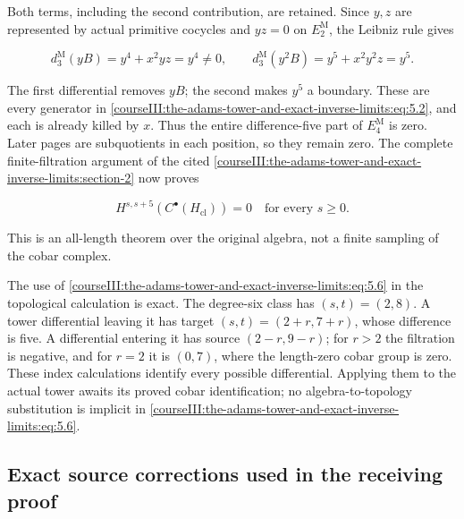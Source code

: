 Both terms, including the second contribution, are retained. Since \(y,z\) are represented by actual primitive cocycles and \(yz=0\) on \(E_2^{\mathrm M}\), the Leibniz rule gives

\begin{equation}
d_3^{\mathrm M}(yB)=y^4+x^2yz=y^4\ne0,
 \qquad d_3^{\mathrm M}(y^2B)=y^5+x^2y^2z=y^5.
 \label{courseIII:the-adams-tower-and-exact-inverse-limits:eq:5.5}
\end{equation}

The first differential removes \(yB\); the second makes \(y^5\) a boundary. These are every generator in \eqref{courseIII:the-adams-tower-and-exact-inverse-limits:eq:5.2}, and each is already killed by \(x\). Thus the entire difference-five part of \(E_4^{\mathrm M}\) is zero. Later pages are subquotients in each position, so they remain zero. The complete finite-filtration argument of the cited \cref{courseIII:the-adams-tower-and-exact-inverse-limits:section-2} now proves

\begin{equation}
H^{s,s+5}(C^\bullet(H_{\mathrm{cl}}))=0
                 \quad\text{for every }s\geq0.
 \label{courseIII:the-adams-tower-and-exact-inverse-limits:eq:5.6}
\end{equation}

This is an all-length theorem over the original algebra, not a finite sampling of the cobar complex.

The use of \eqref{courseIII:the-adams-tower-and-exact-inverse-limits:eq:5.6} in the topological calculation is exact. The degree-six class has \((s,t)=(2,8)\). A tower differential leaving it has target
\((s,t)=(2+r,7+r)\), whose difference is five. A differential entering it has source \((2-r,9-r)\); for \(r>2\) the filtration is negative, and for \(r=2\) it is \((0,7)\), where the length-zero cobar group is zero. These index calculations identify every possible differential. Applying them to the actual tower awaits its proved cobar identification; no algebra-to-topology substitution is implicit in \eqref{courseIII:the-adams-tower-and-exact-inverse-limits:eq:5.6}.

\subsection{Exact source corrections used in the receiving proof}
\label{courseIII:the-adams-tower-and-exact-inverse-limits:adams-source-corrections}

\label{courseIII:the-adams-tower-and-exact-inverse-limits:section-6}\label{courseIII:adams-tower:6}

